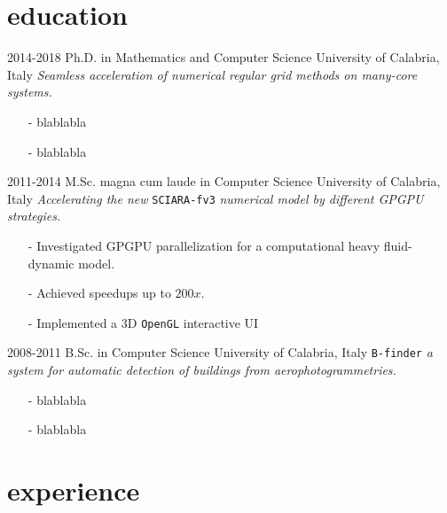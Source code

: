 \documentclass[]{twentysecondscv}
\begin{document}
\section{education}

\begin{twenty}
\fivetwentyitem
    {2014-2018}
    {Ph.D. {\normalfont in Mathematics and Computer Science}}
    {University of Calabria, Italy}
    {\emph{Seamless acceleration of numerical regular grid methods on many-core systems.}}
    {
    	\vspace{-15pt}
    	\begin{itemize}[leftmargin=*]
    		\item[-] blablabla
    		\item[-] blablabla
    	\end{itemize} 
    }
  \fivetwentyitem
    {2011-2014}
    {M.Sc. magna cum laude in Computer Science}
    {University of Calabria, Italy}
    {\emph{Accelerating the new} \texttt{SCIARA-fv3} \emph{numerical model by different GPGPU strategies.}}
    {
    	\vspace{-15pt}
    	\begin{itemize}[leftmargin=*]
    		\footnotesize
    		\item[-] Investigated GPGPU parallelization for a computational heavy fluid-dynamic model.
    		\item[-] Achieved speedups up to $200x$.
			\item[-] Implemented a 3D \texttt{OpenGL} interactive UI
    	\end{itemize} 
    }
  \fivetwentyitem
    {2008-2011}
    {B.Sc. in Computer Science}
    {University of Calabria, Italy}
    {\texttt{B-finder}\emph{ a system for automatic detection of buildings from aerophotogrammetries.}}
    {
    	\vspace{-15pt}
    	\begin{itemize}[leftmargin=*]
    		\footnotesize
    		\item[-] blablabla
    		\item[-] blablabla
    	\end{itemize} 
    }
\end{twenty}


\section{experience}
\end{document}
